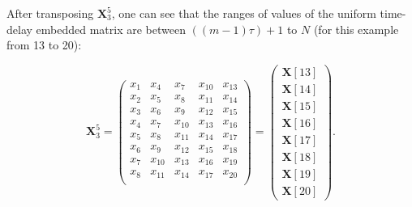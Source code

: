 After transposing $\boldsymbol{X}^{5}_{3}$, one can see that the ranges of
values of the uniform time-delay embedded matrix are between
$ ( (m-1)\tau )+1$  to $N$  (for this example from 13 to 20):

\begin{equation}\label{eq:etdee2}
\boldsymbol{X}^5_3 =
\begin{pmatrix}
x_1 & x_4 & x_{7} & x_{10} & x_{13} \\
x_2 & x_5 & x_{8} & x_{11} & x_{14} \\
x_3 & x_6 & x_{9} & x_{12} & x_{15} \\
x_4 & x_7 & x_{10} & x_{13} & x_{16} \\
x_5 & x_8 & x_{11} & x_{14} & x_{17} \\
x_6 & x_9 & x_{12} & x_{15} & x_{18} \\
x_7 & x_{10} & x_{13} & x_{16} & x_{19} \\
x_8 & x_{11} & x_{14} & x_{17} & x_{20} \\
\end{pmatrix} =
\begin{pmatrix}
   \boldsymbol{X}[13] \\
   \boldsymbol{X}[14] \\
   \boldsymbol{X}[15] \\
   \boldsymbol{X}[16] \\
   \boldsymbol{X}[17] \\
   \boldsymbol{X}[18] \\
   \boldsymbol{X}[19] \\
   \boldsymbol{X}[20]
\end{pmatrix}.
\end{equation}

%





